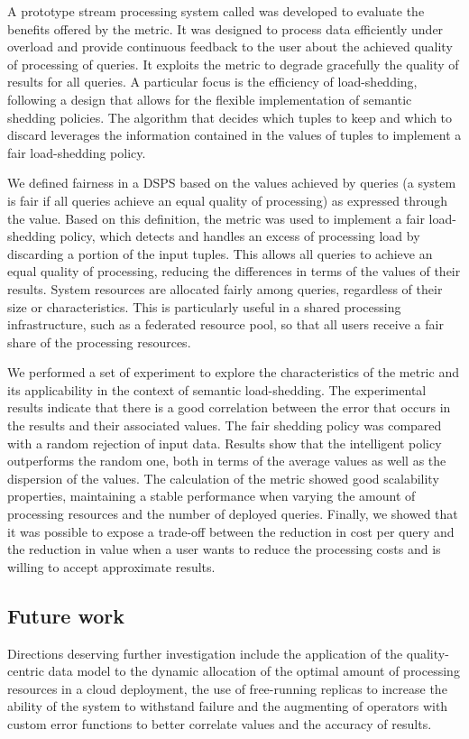 A prototype stream processing system called \sys was developed to evaluate the benefits offered by the
\sic metric. It was designed to process data efficiently under overload and provide continuous feedback
to the user about the achieved quality of processing of queries.
It exploits the \sic metric to degrade gracefully the quality of results for all queries. A particular
focus is the efficiency of \mbox{load-shedding}, following a design that allows for the
flexible implementation of semantic shedding policies. 
The algorithm that decides which tuples to keep and which to discard leverages the information contained
in the \sic values of tuples to implement a fair load-shedding policy.

We defined fairness in a DSPS based on the \sic values achieved by queries (\ie a system is fair if all
queries achieve an equal quality of processing) as expressed through the \sic value.
Based on this definition, the \sic metric was used to implement a fair load-shedding policy, which
detects and handles an excess of processing load by discarding a portion of the input tuples. This allows
all queries to achieve an equal quality of processing, reducing the differences in terms of the \sic
values of their results.
System resources are allocated fairly among queries, regardless of their size or characteristics.
This is particularly useful in a shared processing infrastructure, such as a federated resource pool, so
that all users receive a fair share of the processing resources.

We performed a set of experiment to explore the characteristics of the \sic metric and its
applicability in the context of semantic load-shedding. The experimental results indicate that there is a
good correlation between the error that occurs in the results and their associated \sic values. The
fair shedding policy was compared with a random rejection of input data. Results show that the
intelligent policy outperforms the random one, both in terms of the average \sic values as well as the
dispersion of the values. The calculation of the \sic metric showed good scalability properties,
maintaining a stable performance when varying the amount of processing resources and the number of
deployed queries. Finally, we showed that it was possible to expose a trade-off between the reduction in
cost per query and the reduction in \sic value when a user wants to reduce the processing costs and is willing to accept approximate results.
\\
\subsection*{Future work} 
Directions deserving further investigation include the application of the quality-centric data model to
the dynamic allocation of the optimal amount of processing resources in a cloud deployment, the use
of free-running replicas to increase the ability of the system to withstand failure and the augmenting of
operators with custom error functions to better correlate \sic values and the accuracy of results.

